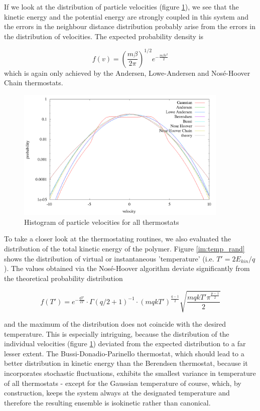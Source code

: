 If we look at the distribution of particle velocities (figure \ref{im:vel_rand}), we see that the kinetic energy and the potential energy are strongly coupled in this system and the errors in the neighbour distance distribution probably arise from the errors in the distribution of velocities. The expected probability density is

\begin{equation}
f(v) = \left(\frac{m\beta}{2\pi}\right)^{1/2}e^{-\frac{m\beta v^2}{2}}
\end{equation} 
which is again only achieved by the Andersen, Lowe-Andersen and Nosé-Hoover Chain thermostats. 

\begin{figure}[H]
\centering
\includegraphics[width=0.9\textwidth]{./graphics/Histogramm_velocity_rand_T=20_p=64.png}
\caption{Histogram of particle velocities for all thermostats}
\label{im:vel_rand}
\end{figure}

To take a closer look at the thermostating routines, we also evaluated the distribution of the total kinetic energy of the polymer. Figure \ref{im:temp_rand} shows the distribution of virtual or instantaneous 'temperature' (i.e. $T' = 2E_{kin}/q$). The values obtained via the Nosé-Hoover algorithm deviate significantly from the theoretical probability distribution

\begin{equation}
f(T') = e^{-\frac{qT'}{2T}}\cdot \Gamma(q/2+1)^{-1}\cdot (mqkT')^{\frac{q-1}{2}} \sqrt{\frac{mqkT'\pi^{\frac{p-1}{2}}}{2}} 
\end{equation}

and the maximum of the distribution does not coincide with the desired temperature. This is especially intriguing, because the distribution of the individual velocities (figure \ref{im:vel_rand}) deviated from the expected distribution to a far lesser extent. 
The Bussi-Donadio-Parinello thermostat, which should lead to a better distribution in kinetic energy than the Berendsen thermostat, because it incorporates stochastic fluctuations, exhibits the smallest variance in temperature of all thermostats - except for the Gaussian temperature of course, which, by construction, keeps the system always at the designated temperature and therefore the resulting ensemble is isokinetic rather than canonical.  

